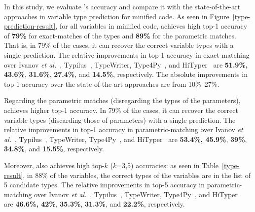 
In this study, we evaluate {\tool}'s accuracy and compare it with the
state-of-the-art approaches in variable type prediction for minified
code. As seen in Figure~\ref{type-prediction-result}, for all
variables in minified code, {\tool} achieves high top-1 accuracy of
{\bf 79\%} for exact-matches of the types and {\bf 89\%} for the
parametric matches. That is, in 79\% of the cases, it can recover the
correct variable types with a single prediction.
%
The relative improvements in top-1 accuracy in exact-matching over
Ivanov {\em et al.}~\cite{ivanov21predicting},
Typilus~\cite{typilus-pldi20}, TypeWriter\cite{typewriter-fse20},
Type4Py~\cite{Type4Py-icse22}, and HiTyper~\cite{HiTyper-icse22} are
{\bf 51.9\%, 43.6\%}, {\bf 31.6\%}, {\bf 27.4\%}, and {\bf
  14.5\%}, respectively. The absolute improvements in top-1 accuracy
over the state-of-the-art approaches are from
10\%--27\%.

Regarding the parametric matches (disregarding the types of the
parameters), {\tool} achieves higher top-1 accuracy. In 79\% of the
cases, it can recover the correct variable types (discarding those of
parameters) with a single prediction. The relative improvements in
top-1 accuracy in parametric-matching over Ivanov {\em et
  al.}~\cite{ivanov21predicting}, Typilus~\cite{typilus-pldi20},
TypeWriter\cite{typewriter-fse20}, Type4Py~\cite{Type4Py-icse22}, and
HiTyper~\cite{HiTyper-icse22} are {\bf 53.4\%, 45.9\%}, {\bf 39\%},
{\bf 34.8\%}, and {\bf 15.5\%}, respectively.

Moreover, {\tool} also achieves high top-$k$ ($k$=3,5) accuracies: as
seen in Table~\ref{type-result}, in 88\% of the variables, the correct
types of the variables are in the list of 5 candidate types. The
relative improvements in top-5 accuracy in parametric-matching over
Ivanov {\em et al.}~\cite{ivanov21predicting},
Typilus~\cite{typilus-pldi20}, TypeWriter\cite{typewriter-fse20},
Type4Py~\cite{Type4Py-icse22}, and HiTyper~\cite{HiTyper-icse22} are
{\bf 46.6\%, 42\%}, {\bf 35.3\%}, {\bf 31.3\%}, and {\bf 22.2\%},
respectively.


